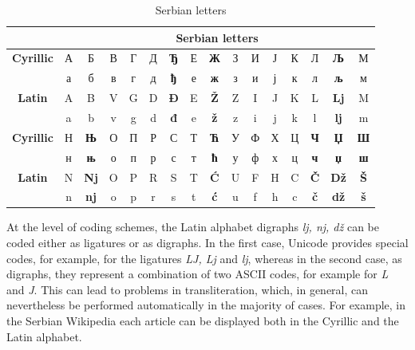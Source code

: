\begin{multicols}{2}
\begin{table}[ht]
\begin{center}
\begin{tabular}{|c|c|c|c|c|c|c|c|c|c|c|c|c|c|c|c|}
\cline{2-16}
\multicolumn{1}{c}{} & \multicolumn{15}{|c|}{{\textbf{Serbian letters}}} \\
\hline
{\textbf{Cyrillic}} & А & Б & В & Г & Д & \textbf{Ђ} & Е & \textbf{Ж} & З & И & Ј & К & Л & \textbf{Љ} & М \\ 
         & а & б & в & г & д & \textbf{ђ} & е & \textbf{ж} & з & и & ј & к & л & \textbf{љ} & м \\
\hline
{\textbf{Latin}} & A & B & V & G & D & \cellcolor{grey3} \textbf{Đ} & E & \cellcolor{grey3} \textbf{Ž} & Z & I & J & K & L & \cellcolor{grey2} \textbf{Lj} & M \\
         & a & b & v & g & d & \cellcolor{grey3} \textbf{đ} & e & \cellcolor{grey3} \textbf{ž} & z & i & j & k & l & \cellcolor{grey2} \textbf{lj} & m \\
\hline
{\textbf{Cyrillic}} & Н & \textbf{Њ} & О & П & Р & С & Т & \textbf{Ћ} & У & Ф & Х & Ц & \textbf{Ч} & \textbf{Џ} & \textbf{Ш} \\
        & н & \textbf{њ} & о & п & р & с & т & \textbf{ћ} & у & ф & х & ц & \textbf{ч} & \textbf{џ} & \textbf{ш} \\
\hline
{\textbf{Latin}} & N & \cellcolor{grey2} \textbf{Nj} & O & P & R & S & T & \cellcolor{grey3} \textbf{Ć} & U & F & H & C & \cellcolor{grey3} \textbf{Č} & \cellcolor{grey2} \textbf{Dž} & \cellcolor{grey3} \textbf{Š} \\
         & n & \cellcolor{grey2} \textbf{nj} & o & p & r & s & t & \cellcolor{grey3} \textbf{ć} & u & f & h & c & \cellcolor{grey3} \textbf{č} & \cellcolor{grey2} \textbf{dž} & \cellcolor{grey3} \textbf{š} \\
\hline
\end{tabular}
\end{center}
\caption{Serbian letters}
\label{alphabet}
\end{table}

At the level of coding schemes, the Latin alphabet digraphs \textit{lj, nj, dž} can be coded either as ligatures or as digraphs. In the first case, Unicode \cite{UNICODE} provides special codes, for example, for the ligatures \textit{LJ, Lj} and \textit{lj}, whereas in the second case, as digraphs, they represent a combination of two ASCII codes, for example for \textit{L} and \textit{J}. This can lead to problems in transliteration, which, in general, can nevertheless be performed automatically in the majority of cases. For example, in the Serbian Wikipedia each article can be displayed both in the Cyrillic and the Latin alphabet.


\end{multicols}
